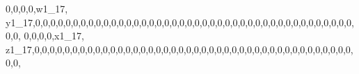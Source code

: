 \documentclass[]{article}
\newenvironment{Shaded}{\begin{snugshade}}{\end{snugshade}}
\newcommand{\DecValTok}[1]{\textcolor[rgb]{0.00,0.00,0.81}{#1}}
\newcommand{\NormalTok}[1]{#1}
\begin{document}
\begin{Shaded}
\begin{Highlighting}[]
\DecValTok{0}\NormalTok{,}\DecValTok{0}\NormalTok{,}\DecValTok{0}\NormalTok{,}\DecValTok{0}\NormalTok{,w1_}\DecValTok{17}\NormalTok{, y1_}\DecValTok{17}\NormalTok{,}\DecValTok{0}\NormalTok{,}\DecValTok{0}\NormalTok{,}\DecValTok{0}\NormalTok{,}\DecValTok{0}\NormalTok{,}\DecValTok{0}\NormalTok{,}\DecValTok{0}\NormalTok{,}\DecValTok{0}\NormalTok{,}\DecValTok{0}\NormalTok{,}\DecValTok{0}\NormalTok{,}\DecValTok{0}\NormalTok{,}\DecValTok{0}\NormalTok{,}\DecValTok{0}\NormalTok{,}\DecValTok{0}\NormalTok{,}\DecValTok{0}\NormalTok{,}\DecValTok{0}\NormalTok{,}\DecValTok{0}\NormalTok{,}\DecValTok{0}\NormalTok{,}\DecValTok{0}\NormalTok{,}\DecValTok{0}\NormalTok{,}\DecValTok{0}\NormalTok{,}\DecValTok{0}\NormalTok{,}\DecValTok{0}\NormalTok{,}\DecValTok{0}\NormalTok{,}\DecValTok{0}\NormalTok{,}\DecValTok{0}\NormalTok{,}\DecValTok{0}\NormalTok{,}\DecValTok{0}\NormalTok{,}\DecValTok{0}\NormalTok{,}\DecValTok{0}\NormalTok{,}\DecValTok{0}\NormalTok{,}\DecValTok{0}\NormalTok{,}\DecValTok{0}\NormalTok{,}\DecValTok{0}\NormalTok{,}\DecValTok{0}\NormalTok{,}\DecValTok{0}\NormalTok{,}\DecValTok{0}\NormalTok{,}\DecValTok{0}\NormalTok{,}\DecValTok{0}\NormalTok{,}\DecValTok{0}\NormalTok{,}\DecValTok{0}\NormalTok{,}\DecValTok{0}\NormalTok{,}\DecValTok{0}\NormalTok{,}\DecValTok{0}\NormalTok{,}\DecValTok{0}\NormalTok{,}
\DecValTok{0}\NormalTok{,}\DecValTok{0}\NormalTok{,}\DecValTok{0}\NormalTok{,}\DecValTok{0}\NormalTok{,x1_}\DecValTok{17}\NormalTok{, z1_}\DecValTok{17}\NormalTok{,}\DecValTok{0}\NormalTok{,}\DecValTok{0}\NormalTok{,}\DecValTok{0}\NormalTok{,}\DecValTok{0}\NormalTok{,}\DecValTok{0}\NormalTok{,}\DecValTok{0}\NormalTok{,}\DecValTok{0}\NormalTok{,}\DecValTok{0}\NormalTok{,}\DecValTok{0}\NormalTok{,}\DecValTok{0}\NormalTok{,}\DecValTok{0}\NormalTok{,}\DecValTok{0}\NormalTok{,}\DecValTok{0}\NormalTok{,}\DecValTok{0}\NormalTok{,}\DecValTok{0}\NormalTok{,}\DecValTok{0}\NormalTok{,}\DecValTok{0}\NormalTok{,}\DecValTok{0}\NormalTok{,}\DecValTok{0}\NormalTok{,}\DecValTok{0}\NormalTok{,}\DecValTok{0}\NormalTok{,}\DecValTok{0}\NormalTok{,}\DecValTok{0}\NormalTok{,}\DecValTok{0}\NormalTok{,}\DecValTok{0}\NormalTok{,}\DecValTok{0}\NormalTok{,}\DecValTok{0}\NormalTok{,}\DecValTok{0}\NormalTok{,}\DecValTok{0}\NormalTok{,}\DecValTok{0}\NormalTok{,}\DecValTok{0}\NormalTok{,}\DecValTok{0}\NormalTok{,}\DecValTok{0}\NormalTok{,}\DecValTok{0}\NormalTok{,}\DecValTok{0}\NormalTok{,}\DecValTok{0}\NormalTok{,}\DecValTok{0}\NormalTok{,}\DecValTok{0}\NormalTok{,}\DecValTok{0}\NormalTok{,}\DecValTok{0}\NormalTok{,}\DecValTok{0}\NormalTok{,}\DecValTok{0}\NormalTok{,}\DecValTok{0}\NormalTok{,}\DecValTok{0}\NormalTok{,}

\end{Highlighting}
\end{Shaded}
\end{document}
